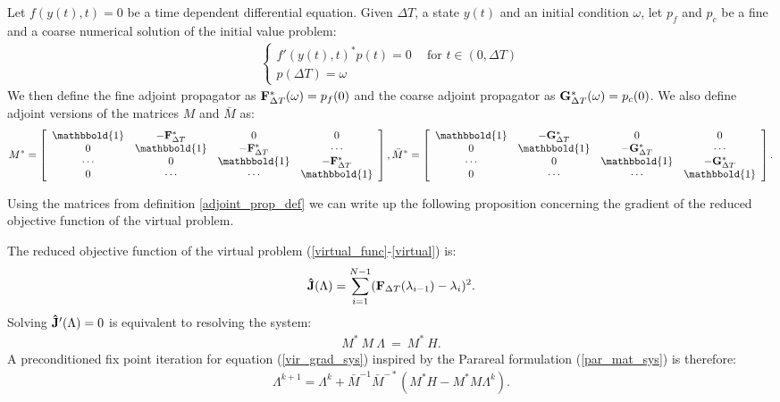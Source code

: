 \begin{definition} \label{adjoint_prop_def}
Let $f(y(t),t)=0$ be a time dependent differential equation. Given $\Delta T$, a state $y(t)$ and an initial condition $\omega$, let $p_f$ and $p_c$ be a fine and a coarse numerical solution of the initial value problem:
\begin{align}
 \left\{
     \begin{array}{lr}
		f'(y(t),t)^*p(t)=0 \ \quad \textrm{for $t \in (0,\Delta T)$} \\
		p(\Delta T)=\omega
	\end{array}
	\right.	
\end{align}
We then define the fine adjoint propagator as $\bold F_{\Delta T}^*(\omega) = p_f(0)$ and the coarse adjoint propagator as $\bold G_{\Delta T}^*(\omega) = p_c(0)$. We also define adjoint versions of the matrices $M$ and $\bar M$ as: 
\begin{align*}
M^*= \left[ \begin{array}{cccc}
   \mathbbold{1} & -\bold{F}_{\Delta T}^* & 0 & 0 \\  
   0 & \mathbbold{1} & -\bold{F}_{\Delta T}^* & \cdots \\ 
   \cdots &0 &  \mathbbold{1} & -\bold{F}_{\Delta T}^* \\
   0 &\cdots &\cdots &  \mathbbold{1}  \\
   \end{array}  \right],
\bar M^*= \left[ \begin{array}{cccc}
   \mathbbold{1} & -\bold{G}_{\Delta T}^* & 0 & 0 \\  
   0 & \mathbbold{1} & -\bold{G}_{\Delta T}^* & \cdots \\ 
   \cdots &0 &  \mathbbold{1} & -\bold{G}_{\Delta T}^* \\
   0 &\cdots &\cdots &  \mathbbold{1}  \\
   \end{array}  \right].
\end{align*}
\end{definition} 
\noindent
Using the matrices from definition \ref{adjoint_prop_def} we can write up the following proposition concerning the gradient of the reduced objective function of the virtual problem.
\begin{proposition} \label{vir_grad_prop}
The reduced objective function of the virtual problem (\ref{virtual_func}-\ref{virtual}) is:
\begin{align}
\bold{\hat J}(\Lambda) = \sum_{i=1}^{N-1} (\bold F_{\Delta T}(\lambda_{i-1})-\lambda_{i})^2.\label{reduced_viritual}
\end{align}
Solving $\bold{\hat J}'(\Lambda)=0$ is equivalent to resolving the system:
\begin{align}
M^* \ M \ \Lambda \ = \ M^* \ H. \label{vir_grad_sys}
\end{align}
A preconditioned fix point iteration for equation (\ref{vir_grad_sys}) inspired by the Parareal formulation (\ref{par_mat_sys}) is therefore:
\begin{align}
\Lambda^{k+1} = \Lambda^k + \bar{M}^{-1}\bar M^{-*}(M^*H-M^*M\Lambda^k). \label{grad_fix_iter}
\end{align}
\end{proposition}
